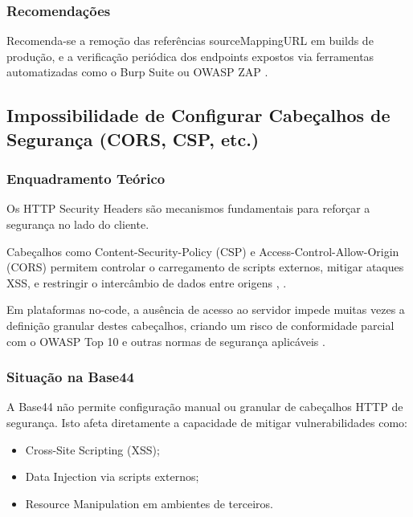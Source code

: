 \subsubsection{Recomendações}

Recomenda-se a remoção das referências sourceMappingURL em builds de produção, e a verificação periódica dos endpoints expostos via ferramentas automatizadas como o Burp Suite ou OWASP ZAP \cite{ref23}.

\subsection{Impossibilidade de Configurar Cabeçalhos de Segurança (CORS, CSP, etc.)}

\subsubsection{Enquadramento Teórico}

Os HTTP Security Headers são mecanismos fundamentais para reforçar a segurança no lado do cliente.

Cabeçalhos como Content-Security-Policy (CSP) e Access-Control-Allow-Origin (CORS) permitem controlar o carregamento de scripts externos, mitigar ataques XSS, e restringir o intercâmbio de dados entre origens \cite{ref19}, \cite{ref24}.

Em plataformas no-code, a ausência de acesso ao servidor impede muitas vezes a definição granular destes cabeçalhos, criando um risco de conformidade parcial com o OWASP Top 10 e outras normas de segurança aplicáveis \cite{ref25}.

\subsubsection{Situação na Base44}

A Base44 não permite configuração manual ou granular de cabeçalhos HTTP de segurança. Isto afeta diretamente a capacidade de mitigar vulnerabilidades como:

\begin{itemize}

\item Cross-Site Scripting (XSS);

\item Data Injection via scripts externos;

\item Resource Manipulation em ambientes de terceiros.

\end{itemize}

